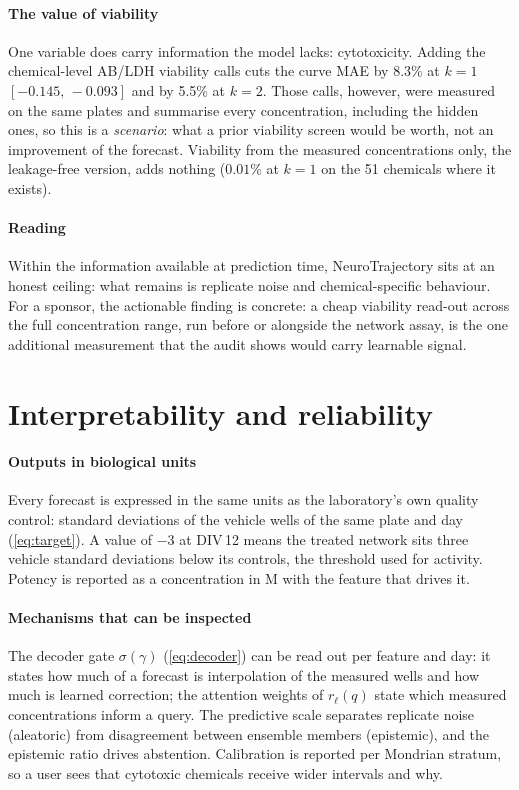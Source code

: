 \documentclass[11pt,a4paper]{article}
\newcommand{\NT}{NeuroTrajectory}
\newcommand{\ci}[2]{\ensuremath{[#1,\,#2]}}          %
\newcommand{\sgn}[1]{\ensuremath{#1}}                  %
\begin{document}
\paragraph{The value of viability}
One variable does carry information the model lacks: cytotoxicity. Adding the chemical-level AB/LDH viability
calls cuts the curve MAE by 8.3\% at \(k=1\)
\ci{ -0.145 }{ -0.093 } and by
5.5\% at \(k=2\). Those calls, however, were measured
on the same plates and summarise every concentration, including the hidden ones, so this is a
\emph{scenario}: what a prior viability screen would be worth, not an improvement of the forecast. Viability from
the measured concentrations only, the leakage-free version, adds nothing
(\sgn{ 0.01 }\% at \(k=1\) on the
51 chemicals where it exists).

\paragraph{Reading}
Within the information available at prediction time, \NT{} sits at an honest ceiling: what remains is replicate
noise and chemical-specific behaviour. For a sponsor, the actionable finding is concrete: a cheap viability read-out
across the full concentration range, run before or alongside the network assay, is the one additional measurement
that the audit shows would carry learnable signal.

\section{Interpretability and reliability}\label{sec:interpret}

\paragraph{Outputs in biological units}
Every forecast is expressed in the same units as the laboratory's own quality control: standard deviations of the
vehicle wells of the same plate and day (\cref{eq:target}). A value of \(-3\) at DIV\,12 means the treated network
sits three vehicle standard deviations below its controls, the threshold used for activity. Potency is reported
as a concentration in \textmu M with the feature that drives it.

\paragraph{Mechanisms that can be inspected}
The decoder gate \(\sigma(\gamma)\) (\cref{eq:decoder}) can be read out per feature and day: it states how much of
a forecast is interpolation of the measured wells and how much is learned correction; the attention weights of
\(r_\ell(q)\) state which measured concentrations inform a query. The predictive scale separates replicate noise (aleatoric) from
disagreement between ensemble members (epistemic), and the epistemic ratio drives abstention. Calibration is
reported per Mondrian stratum, so a user sees that cytotoxic chemicals receive wider intervals and why.
\end{document}
